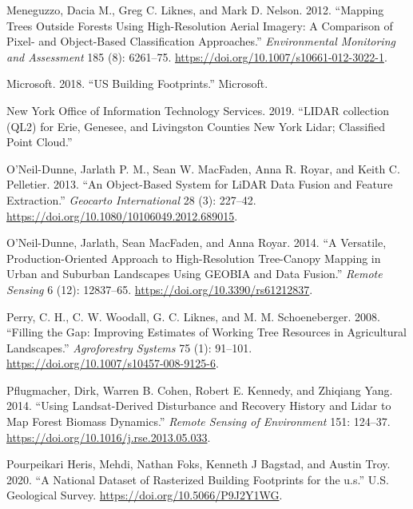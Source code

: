 \documentclass[]{elsarticle} %
\newlength{\cslhangindent}
\newenvironment{CSLReferences}[2] %
 {%
  \setlength{\parindent}{0pt}
  \ifodd #1 \everypar{\setlength{\hangindent}{\cslhangindent}}\ignorespaces\fi
  \ifnum #2 > 0
  \setlength{\parskip}{#2\baselineskip}
  \fi
 }%
 {}
\begin{document}
\begin{CSLReferences}{1}{0}
\leavevmode{}%
Meneguzzo, Dacia M., Greg C. Liknes, and Mark D. Nelson. 2012. {``Mapping Trees Outside Forests Using High-Resolution Aerial Imagery: A Comparison of Pixel- and Object-Based Classification Approaches.''} \emph{Environmental Monitoring and Assessment} 185 (8): 6261--75. \url{https://doi.org/10.1007/s10661-012-3022-1}.

\leavevmode{}%
Microsoft. 2018. {``{US Building Footprints.}''} Microsoft.

\leavevmode{}%
New York Office of Information Technology Services. 2019. {``{LIDAR collection (QL2) for Erie, Genesee, and Livingston Counties New York Lidar; Classified Point Cloud}.''}

\leavevmode{}%
O'Neil-Dunne, Jarlath P. M., Sean W. MacFaden, Anna R. Royar, and Keith C. Pelletier. 2013. {``An Object-Based System for LiDAR Data Fusion and Feature Extraction.''} \emph{Geocarto International} 28 (3): 227--42. \url{https://doi.org/10.1080/10106049.2012.689015}.

\leavevmode{}%
O'Neil-Dunne, Jarlath, Sean MacFaden, and Anna Royar. 2014. {``A Versatile, Production-Oriented Approach to High-Resolution Tree-Canopy Mapping in Urban and Suburban Landscapes Using GEOBIA and Data Fusion.''} \emph{Remote Sensing} 6 (12): 12837--65. \url{https://doi.org/10.3390/rs61212837}.

\leavevmode{}%
Perry, C. H., C. W. Woodall, G. C. Liknes, and M. M. Schoeneberger. 2008. {``Filling the Gap: Improving Estimates of Working Tree Resources in Agricultural Landscapes.''} \emph{Agroforestry Systems} 75 (1): 91--101. \url{https://doi.org/10.1007/s10457-008-9125-6}.

\leavevmode{}%
Pflugmacher, Dirk, Warren B. Cohen, Robert E. Kennedy, and Zhiqiang Yang. 2014. {``Using Landsat-Derived Disturbance and Recovery History and Lidar to Map Forest Biomass Dynamics.''} \emph{Remote Sensing of Environment} 151: 124--37. \url{https://doi.org/10.1016/j.rse.2013.05.033}.

\leavevmode{}%
Pourpeikari Heris, Mehdi, Nathan Foks, Kenneth J Bagstad, and Austin Troy. 2020. {``A National Dataset of Rasterized Building Footprints for the u.s.''} U.S. Geological Survey. \url{https://doi.org/10.5066/P9J2Y1WG}.


\end{CSLReferences}
\end{document}
